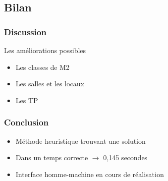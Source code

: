 \documentclass{beamer}
\begin{document}
\subsection{Bilan}
\begin{frame}
\frametitle{Discussion}
\begin{block}{Les améliorations possibles}
\begin{itemize}
\item Les classes de M2
\item Les salles et les locaux
\item Les TP
\end{itemize}
\end{block}
\end{frame}

\begin{frame}
\frametitle {Conclusion}
\begin{itemize}
\item Méthode heuristique trouvant une solution\\
\item Dans un temps correcte $\rightarrow$ 0,145 secondes\\
\item Interface homme-machine en cours de réalisation
\end{itemize}
\end{frame}
\end{document}
